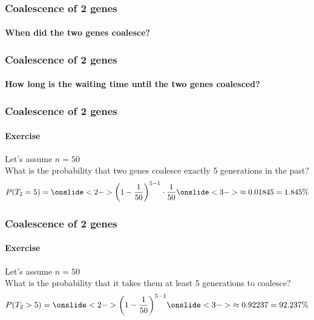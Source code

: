\documentclass{beamer}
\begin{document}
        \begin{frame}
            \frametitle{Coalescence of 2 genes}
            \framesubtitle{When did the two genes coalesce? }
        \end{frame}

        \begin{frame}
            \frametitle{Coalescence of 2 genes}
            \framesubtitle{How long is the waiting time until the two genes coalesced?}
        \end{frame}

        \begin{frame}
            \frametitle{Coalescence of 2 genes}
            \framesubtitle{Exercise}
            Let's assume $n = 50$ \\
            What is the probability that two genes coalesce exactly 5 generations in the past? \\ 
                \[
                    P(T_{2} = 5) =
                    \onslide<2->{\left(1 - \frac{1}{50}\right)^{5-1} \cdot \frac{1}{50}}
                    \onslide<3->{\approx 0.01845 = 1.845\%}
                \]
        \end{frame}

        \begin{frame}
            \frametitle{Coalescence of 2 genes}
            \framesubtitle{Exercise}
            Let's assume $n = 50$ \\
            What is the probability that it takes them at least 5 generations to coalesce? \\ 
                \[
                    P(T_{2} > 5) =
                    \onslide<2->{\left(1 - \frac{1}{50}\right)^{5-1}}
                    \onslide<3->{\approx 0.92237 = 92.237\%}
                \]
        \end{frame}
\end{document}
